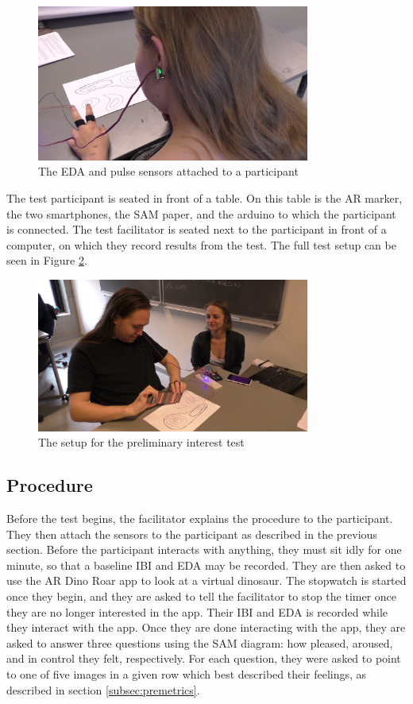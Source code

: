 \begin{figure}[h!]
    \centering
    \includegraphics[width=0.8\textwidth]{figures/pretest_ear.png}
    \caption{The EDA and pulse sensors attached to a participant}\label{fig:pretest_ear}
\end{figure}

The test participant is seated in front of a table. On this table is the AR marker, the two smartphones, the SAM paper, and the arduino to which the participant is connected. The test facilitator is seated next to the participant in front of a computer, on which they record results from the test. The full test setup can be seen in Figure \ref{fig:pretest_setup}.

\begin{figure}[h!]
    \centering
    \includegraphics[width=0.8\textwidth]{figures/pretest_setup.png}
    \caption{The setup for the preliminary interest test}\label{fig:pretest_setup}
\end{figure}

\subsection{Procedure}
Before the test begins, the facilitator explains the procedure to the participant. They then attach the sensors to the participant as described in the previous section. Before the participant interacts with anything, they must sit idly for one minute, so that a baseline IBI and EDA may be recorded. They are then asked to use the AR Dino Roar app to look at a virtual dinosaur. The stopwatch is started once they begin, and they are asked to tell the facilitator to stop the timer once they are no longer interested in the app. Their IBI and EDA is recorded while they interact with the app. Once they are done interacting with the app, they are asked to answer three questions using the SAM diagram: how pleased, aroused, and in control they felt, respectively. For each question, they were asked to point to one of five images in a given row which best described their feelings, as described in section \ref{subsec:premetrics}.

